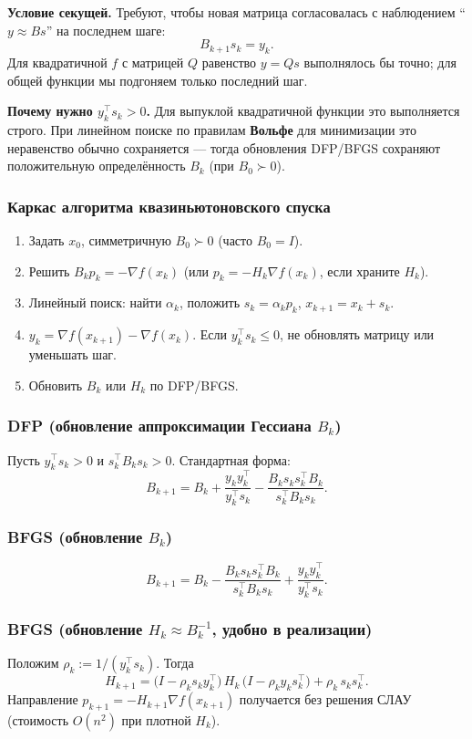 \documentclass[12pt,a4paper]{article}
\newcommand{\grad}{\nabla}
\begin{document}
\textbf{Условие секущей.} Требуют, чтобы новая матрица согласовалась с наблюдением ``\(y\approx B s\)'' на последнем шаге:
\[
  B_{k+1}s_k=y_k.
\]
Для квадратичной \(f\) с матрицей \(Q\) равенство \(y=Qs\) выполнялось бы точно; для общей функции мы подгоняем только последний шаг.

\textbf{Почему нужно \(y_k^\top s_k>0\).} Для выпуклой квадратичной функции это выполняется строго. При линейном поиске по правилам \textbf{Вольфе} для минимизации это неравенство обычно сохраняется --- тогда обновления DFP/BFGS сохраняют положительную определённость \(B_k\) (при \(B_0\succ0\)).

\subsubsection{Каркас алгоритма квазиньютоновского спуска}
\begin{enumerate}
  \item Задать \(x_0\), симметричную \(B_0\succ0\) (часто \(B_0=I\)).
  \item Решить \(B_k p_k=-\grad f(x_k)\) (или \(p_k=-H_k\grad f(x_k)\), если храните \(H_k\)).
  \item Линейный поиск: найти \(\alpha_k\), положить \(s_k=\alpha_k p_k\), \(x_{k+1}=x_k+s_k\).
  \item \(y_k=\grad f(x_{k+1})-\grad f(x_k)\). Если \(y_k^\top s_k\le0\), не обновлять матрицу или уменьшать шаг.
  \item Обновить \(B_k\) или \(H_k\) по DFP/BFGS.
\end{enumerate}

\subsubsection{DFP (обновление аппроксимации Гессиана \(B_k\))}
Пусть \(y_k^\top s_k>0\) и \(s_k^\top B_k s_k>0\). Стандартная форма:
\[
  B_{k+1}=B_k+\frac{y_k y_k^\top}{y_k^\top s_k}-\frac{B_k s_k s_k^\top B_k}{s_k^\top B_k s_k}.
\]

\subsubsection{BFGS (обновление \(B_k\))}
\[
  B_{k+1}=B_k-\frac{B_k s_k s_k^\top B_k}{s_k^\top B_k s_k}+\frac{y_k y_k^\top}{y_k^\top s_k}.
\]

\subsubsection{BFGS (обновление \(H_k\approx B_k^{-1}\), удобно в реализации)}
Положим \(\rho_k:=1/(y_k^\top s_k)\). Тогда
\[
  H_{k+1}=\bigl(I-\rho_k s_k y_k^\top\bigr)\,H_k\,\bigl(I-\rho_k y_k s_k^\top\bigr)+\rho_k\,s_k s_k^\top.
\]
Направление \(p_{k+1}=-H_{k+1}\grad f(x_{k+1})\) получается без решения СЛАУ (стоимость \(O(n^2)\) при плотной \(H_k\)).
\end{document}
